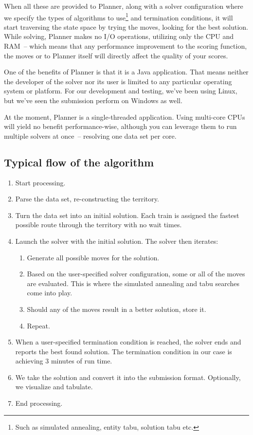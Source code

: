 \documentclass[10pt,a4paper,final]{article}
\begin{document}
When all these are provided to Planner, along with a solver configuration where we specify  the types of algorithms to use\footnote{Such as simulated annealing, entity tabu, solution tabu etc.} and termination conditions, it will start traversing the state space by trying the moves, looking for the best solution. While solving, Planner makes no I/O operations, utilizing only the CPU and RAM~-- which means that any performance improvement to the scoring function, the moves or to Planner itself will directly affect the quality of your scores. 

One of the benefits of Planner is that it is a Java application. That means neither the developer of the solver nor its user is limited to any particular operating system or platform. For our development and testing, we've been using Linux, but we've seen the submission perform on Windows as well.

At the moment, Planner is a single-threaded application. Using multi-core CPUs will yield no benefit performance-wise, although you can leverage them to run multiple solvers at once~-- resolving one data set per core.

\subsection{Typical flow of the algorithm}

\begin{enumerate}
\item Start processing.
\item Parse the data set, re-constructing the territory.
\item Turn the data set into an initial solution. Each train is assigned the fastest possible route through the territory with no wait times. 
\item Launch the solver with the initial solution. The solver then iterates:

\begin{enumerate}
\item Generate all possible moves for the solution.
\item Based on the user-specified solver configuration, some or all of the moves are evaluated. This is where the simulated annealing and tabu searches come into play.
\item Should any of the moves result in a better solution, store it.
\item Repeat.
\end{enumerate}

\item When a user-specified termination condition is reached, the solver ends and reports the best found solution. The termination condition in our case is achieving 3 minutes of run time.
\item We take the solution and convert it into the submission format. Optionally, we visualize and tabulate.
\item End processing.
\end{enumerate}
\end{document}
